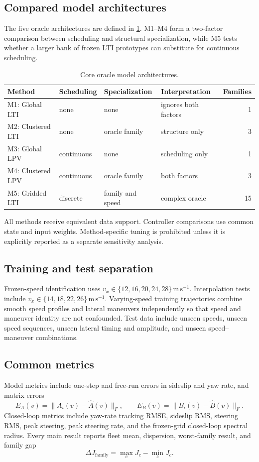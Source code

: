 \subsection{Compared model architectures}
The five oracle architectures are defined in \cref{tab:methods}. M1--M4 form a
two-factor comparison between scheduling and structural specialization, while M5
tests whether a larger bank of frozen LTI prototypes can substitute for continuous
scheduling.
\begin{table}[ht]
\centering
\caption{Core oracle model architectures.}
\label{tab:methods}
\begin{tabular}{llllr}
\toprule
Method & Scheduling & Specialization & Interpretation & Families\\
\midrule
M1: Global LTI & none & none & ignores both factors & 1\\
M2: Clustered LTI & none & oracle family & structure only & 3\\
M3: Global LPV & continuous & none & scheduling only & 1\\
M4: Clustered LPV & continuous & oracle family & both factors & 3\\
M5: Gridded LTI & discrete & family and speed & complex oracle & 15\\
\bottomrule
\end{tabular}
\end{table}
All methods receive equivalent data support. Controller comparisons use common
state and input weights. Method-specific tuning is prohibited unless it is
explicitly reported as a separate sensitivity analysis.

\subsection{Training and test separation}
Frozen-speed identification uses
$v_x\in\{12,16,20,24,28\}\,\mathrm{m\,s^{-1}}$. Interpolation tests include
$v_x\in\{14,18,22,26\}\,\mathrm{m\,s^{-1}}$. Varying-speed training trajectories
combine smooth speed profiles and lateral maneuvers independently so that speed
and maneuver identity are not confounded. Test data include unseen speeds, unseen
speed sequences, unseen lateral timing and amplitude, and unseen speed--maneuver
combinations.

\subsection{Common metrics}
Model metrics include one-step and free-run errors in sideslip and yaw rate, and
matrix errors
\begin{equation}
 E_A(v)=\lVert A_i(v)-\hat A(v)\rVert_F,\qquad
 E_B(v)=\lVert B_i(v)-\hat B(v)\rVert_F.
\end{equation}
Closed-loop metrics include yaw-rate tracking RMSE, sideslip RMS, steering RMS,
peak steering, peak steering rate, and the frozen-grid closed-loop spectral
radius. Every main result reports fleet mean, dispersion, worst-family result,
and family gap
\begin{equation}
 \Delta J_{\mathrm{family}}=\max_c J_c-\min_c J_c.
\end{equation}


